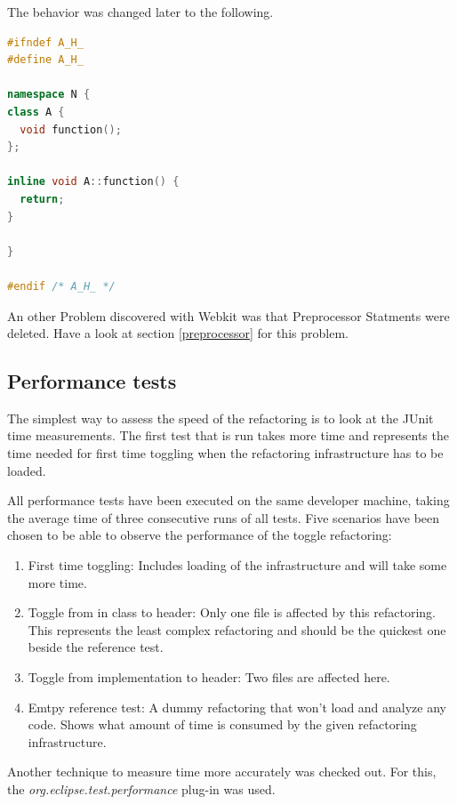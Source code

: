 The behavior was changed later to the following.

\begin{lstlisting}[caption={A.h, function definition in namespace},
label={wrongnamespace2}, language=C++]
#ifndef A_H_
#define A_H_

namespace N {
class A {
  void function();
};

inline void A::function() {
  return;
}

}

#endif /* A_H_ */
\end{lstlisting}

An other Problem discovered with Webkit was that Preprocessor Statments were
deleted. Have a look at section \ref{preprocessor} for this problem.

\subsection{Performance tests}

The simplest way to assess the speed of the refactoring is to look at the JUnit
time measurements. The first test that is run takes more time and represents the 
time needed for first time toggling when the refactoring infrastructure has to 
be loaded. 

All performance tests have been executed on the same developer machine, taking
the average time of three consecutive runs of all tests. Five scenarios have
been chosen to be able to observe the performance of the toggle refactoring:

\begin{enumerate}
\item First time toggling: Includes loading of the infrastructure and will take 
some more time.
\item Toggle from in class to header: Only one file is affected by this 
refactoring. This represents the least complex refactoring and should be the 
quickest one beside the reference test.
\item Toggle from implementation to header: Two files are affected here.
\item Emtpy reference test: A dummy refactoring that won't load and analyze any 
code. Shows what amount of time is consumed by the given refactoring 
infrastructure.
\end{enumerate}

Another technique to measure time more accurately was checked out. For this, the 
\textit{org.eclipse.test.performance} plug-in was used.
